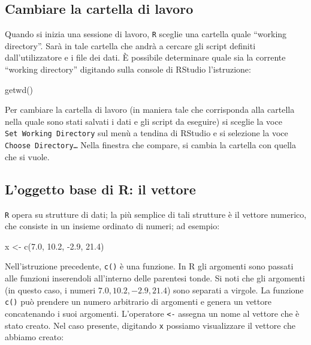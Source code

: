 \documentclass[
]{memoir}
\newenvironment{Shaded}{\begin{snugshade}}{\end{snugshade}}
\newcommand{\FloatTok}[1]{\textcolor[rgb]{0.00,0.00,0.81}{#1}}
\newcommand{\FunctionTok}[1]{\textcolor[rgb]{0.00,0.00,0.00}{#1}}
\newcommand{\NormalTok}[1]{#1}
\newcommand{\OtherTok}[1]{\textcolor[rgb]{0.56,0.35,0.01}{#1}}
\newcommand{\SpecialCharTok}[1]{\textcolor[rgb]{0.00,0.00,0.00}{#1}}
\theoremstyle{definition}
\theoremstyle{definition}
\theoremstyle{definition}
\theoremstyle{definition}
\theoremstyle{remark}
\begin{document}
\hypertarget{cambiare-la-cartella-di-lavoro}{%
\subsection{Cambiare la cartella di lavoro}\label{cambiare-la-cartella-di-lavoro}}

Quando si inizia una sessione di lavoro, \texttt{R} sceglie una cartella quale
``working directory''. Sarà in tale cartella che andrà a cercare gli
script definiti dall'utilizzatore e i file dei dati. È possibile
determinare quale sia la corrente ``working directory'' digitando sulla
console di RStudio l'istruzione:

\begin{Shaded}
\begin{Highlighting}[]
\FunctionTok{getwd}\NormalTok{()}
\end{Highlighting}
\end{Shaded}

Per cambiare la cartella di lavoro (in maniera tale che corrisponda alla
cartella nella quale sono stati salvati i dati e gli script da eseguire)
si sceglie la voce \texttt{Set\ Working\ Directory} sul menù a tendina di RStudio
e si selezione la voce \texttt{Choose\ Directory\ldots{}} Nella finestra che compare,
si cambia la cartella con quella che si vuole.

\hypertarget{loggetto-base-di-r-il-vettore}{%
\subsection{L'oggetto base di R: il vettore}\label{loggetto-base-di-r-il-vettore}}

\texttt{R} opera su strutture di dati; la più semplice di tali strutture è il
vettore numerico, che consiste in un insieme ordinato di numeri; ad
esempio:

\begin{Shaded}
\begin{Highlighting}[]
\NormalTok{x }\OtherTok{\textless{}{-}} \FunctionTok{c}\NormalTok{(}\FloatTok{7.0}\NormalTok{, }\FloatTok{10.2}\NormalTok{, }\SpecialCharTok{{-}}\FloatTok{2.9}\NormalTok{, }\FloatTok{21.4}\NormalTok{)}
\end{Highlighting}
\end{Shaded}

Nell'istruzione precedente, \texttt{c()} è una funzione. In R gli argomenti
sono passati alle funzioni inserendoli all'interno delle parentesi
tonde. Si noti che gli argomenti (in questo caso, i numeri
\(7.0, 10.2, -2.9, 21.4\)) sono separati a virgole. La funzione \texttt{c()} può
prendere un numero arbitrario di argomenti e genera un vettore
concatenando i suoi argomenti. L'operatore \texttt{\textless{}-} assegna un nome al
vettore che è stato creato. Nel caso presente, digitando \texttt{x} possiamo
visualizzare il vettore che abbiamo creato:
\end{document}
